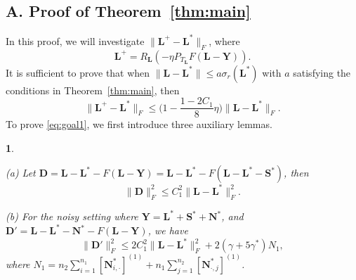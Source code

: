 \documentclass[12pt]{article}
\newcommand{\bL}{\boldsymbol{L}}
\newcommand{\bD}{\boldsymbol{D}}
\def\bS{\boldsymbol{S}}
\def\bY{\boldsymbol{Y}}
\def\bN{\boldsymbol{N}}
\theoremstyle{plain}
\newtheorem{lem}{\protect\lemmaname}
\theoremstyle{definition}
\theoremstyle{plain}
\theoremstyle{plain}
\theoremstyle{remark}
\providecommand{\lemmaname}{Lemma}
\begin{document}
\subsection*{A. Proof of Theorem~\ref{thm:main}}
In this proof, we will investigate $\|\bL^+-\bL^*\|_F$, where 
\[
\bL^+=R_{\bL}(-\eta P_{T_{\bL}} F(\bL-\bY)).
\]
It is sufficient to prove that when $\|\bL-\bL^*\|\leq a \sigma_r(\bL^*)$ with $a$ satisfying the conditions in Theorem~\ref{thm:main}, then
\begin{equation}\label{eq:goal1}
\|\bL^+-\bL^*\|_F\leq \Big(1-\frac{1-2C_1}{8}\eta\Big) \|\bL-\bL^*\|_F.
\end{equation}
To prove \eqref{eq:goal1}, we first introduce three auxiliary lemmas.
\begin{lem}\label{lemma:bD}
\begin{description}
\item (a) Let $\bD=\bL-\bL^*-F(\bL-\bY)=\bL-\bL^*-F(\bL-\bL^*-\bS^*)$, then
\begin{equation}\label{eq:second_bound}
\|\bD\|_F^2\leq C_1^2\|\bL-\bL^*\|_F^2.
\end{equation}

\item (b) For the noisy setting where $\bY=\bL^*+\bS^*+\bN^*$, and $\bD'=\bL-\bL^*-\bN^*-F(\bL-\bY)$, we have
\begin{equation}\label{eq:second_bound_noisy}
\|\bD'\|_F^2\leq 2C_1^2\|\bL-\bL^*\|_F^2+2(\gamma+5\gamma^*)N_1,
\end{equation}
where $N_1=n_2\sum_{i=1}^{n_1}[\bN^*_{i,\cdot}]^{(1)}+n_1\sum_{j=1}^{n_2}[\bN^*_{\cdot,j}]^{(1)}$. 
\end{description}
\end{lem}
\end{document}
